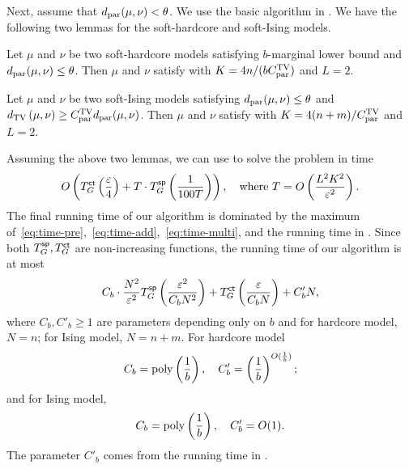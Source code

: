 Next, assume that $d_\mathrm{par}(\mu,\nu) < \theta$. 
We use the basic algorithm in .
We have the following two lemmas for the soft-hardcore and soft-Ising models.

\begin{lemma}\label{lem:par-hardcore}
Let $\mu$ and $\nu$ be two soft-hardcore models satisfying $b$-marginal lower bound and $d_\mathrm{par}(\mu,\nu) \leq \theta$. Then $\mu$ and $\nu$ satisfy  with $K = {4n}/{(bC^\text{TV}_{\mathrm{par}})}$ and $L = 2$.
\end{lemma}

\begin{lemma}\label{lem:par-Ising}
Let $\mu$ and $\nu$ be two soft-Ising models satisfying $d_\mathrm{par}(\mu,\nu) \leq \theta$ and $d_{\mathrm{TV}}\left({\mu},{\nu}\right) \geq C^\text{TV}_{\mathrm{par}} d_\mathrm{par}(\mu,\nu)$. Then $\mu$ and $\nu$ satisfy  with $K = 4(n+m)/C^\text{TV}_{\mathrm{par}}$ and $L = 2$.
\end{lemma}

Assuming the above two lemmas, we can use  to solve the problem in time 
\begin{align}\label{eq:time-multi}
  O\left(T^{\textsf{ct}}_G\left(\frac{\varepsilon}{4}\right) + T \cdot T^{\textsf{sp}}_G\left(\frac{1}{100T}\right)\right), \quad\text{where } T = O\left(\frac{L^2K^2}{\varepsilon^2}\right).
\end{align}
The final running time of our algorithm is dominated by the maximum of~\eqref{eq:time-pre},~\eqref{eq:time-add},~\eqref{eq:time-multi}, and the running time in . Since both $T^{\textsf{sp}}_G,T^{\textsf{ct}}_G$ are non-increasing functions, the running time of our algorithm is at most
\begin{align*}
    C_b \cdot \frac{N^2}{\varepsilon^2} T^{\textsf{sp}}_G \left( \frac{\varepsilon^2}{C_b N^2}\right) + T^{\textsf{ct}}_G\left(\frac{\varepsilon}{C_b N}\right) + C'_b N,
\end{align*}
where $C_b, C'_b \geq 1$ are parameters depending only on $b$ and for hardcore model, $N = n$; for Ising model, $N = n+ m$. 
For hardcore model
\begin{align*}
    C_b = \mathrm{poly}\left(\frac{1}{b}\right), \quad C'_b  = \left(\frac{1}{b}\right)^{O(\frac{1}{b})};
\end{align*}
and for Ising model,
\begin{align*}
    C_b = \mathrm{poly}\left(\frac{1}{b}\right), \quad C'_b = O(1).
\end{align*}
The parameter $C'_b$ comes from the running time in .

